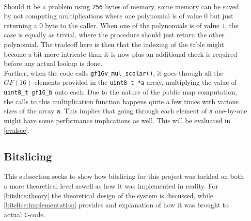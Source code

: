 \medskip\\
Should it be a problem using \texttt{256} bytes of memory, some memory can be saved by not computing multiplications where one polynomial is of value $0$ but just returning a $0$ byte to the caller. When one of the polynomials is of value $1$, the case is equally as trivial, where the procedure should just return the other polynomial. The tradeoff here is then that the indexing of the table might become a bit more intricate than it is now plus an additional check is required before any actual lookup is done.
\medskip\\
Further, when the code calls \texttt{gf16v\_mul\_scalar()}, it goes through all the $GF(16)$ elements provided in the \texttt{uint8\_t *a} array, multiplying the value of \texttt{uint8\_t gf16\_b} onto each. Due to the nature of the public map computation, the calls to this multiplication function happens quite a few times with various sizes of the array \texttt{a}. This implies that going through each element of \texttt{a} one-by-one might have some performance implications as well. This will be evaluated in \cref{evalsec}.
\subsection{Bitslicing} \label{opt:bitslice}
This subsection seeks to show how bitslicing for this project was tackled on both a more theoretical level aswell as how it was implemented in reality. For \cref{bitslice:theory} the theoretical design of the system is discussed, while \cref{bitslice:implementation} provides and explanation of how it was brought to actual \texttt{C}-code.
